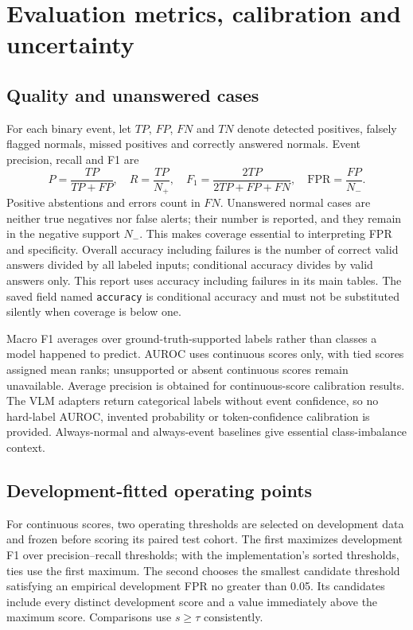 \documentclass[11pt,a4paper]{article}
\newcommand{\code}[1]{\nolinkurl{#1}}
\begin{document}
\section{Evaluation metrics, calibration and uncertainty}
\subsection{Quality and unanswered cases}
For each binary event, let $TP$, $FP$, $FN$ and $TN$ denote detected positives, falsely flagged normals, missed positives and correctly answered normals. Event precision, recall and F1 are
\begin{equation}
 P=\frac{TP}{TP+FP},\quad R=\frac{TP}{N_+},\quad
 F_1=\frac{2TP}{2TP+FP+FN},\quad \mathrm{FPR}=\frac{FP}{N_-}.
\end{equation}
Positive abstentions and errors count in $FN$. Unanswered normal cases are neither true negatives nor false alerts; their number is reported, and they remain in the negative support $N_-$. This makes coverage essential to interpreting FPR and specificity. Overall accuracy including failures is the number of correct valid answers divided by all labeled inputs; conditional accuracy divides by valid answers only. This report uses accuracy including failures in its main tables. The saved field named \code{accuracy} is conditional accuracy and must not be substituted silently when coverage is below one.

Macro F1 averages over ground-truth-supported labels rather than classes a model happened to predict. AUROC uses continuous scores only, with tied scores assigned mean ranks; unsupported or absent continuous scores remain unavailable. Average precision is obtained for continuous-score calibration results. The VLM adapters return categorical labels without event confidence, so no hard-label AUROC, invented probability or token-confidence calibration is provided. Always-normal and always-event baselines give essential class-imbalance context.

\subsection{Development-fitted operating points}
For continuous scores, two operating thresholds are selected on development data and frozen before scoring its paired test cohort. The first maximizes development F1 over precision--recall thresholds; with the implementation's sorted thresholds, ties use the first maximum. The second chooses the smallest candidate threshold satisfying an empirical development FPR no greater than 0.05. Its candidates include every distinct development score and a value immediately above the maximum score. Comparisons use $s\geq\tau$ consistently.
\end{document}
